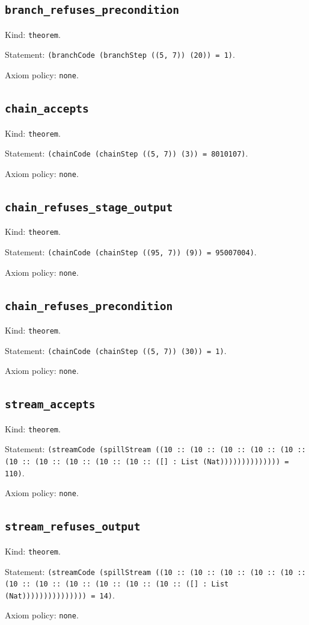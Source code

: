 \documentclass[11pt]{article}
\begin{document}
\subsection*{\texttt{branch\_refuses\_precondition}}
\noindent Kind: \texttt{theorem}.\par
\noindent Statement: \texttt{(branchCode (branchStep ((5, 7)) (20)) = 1)}.\par
\noindent Axiom policy: \texttt{none}.\par
\subsection*{\texttt{chain\_accepts}}
\noindent Kind: \texttt{theorem}.\par
\noindent Statement: \texttt{(chainCode (chainStep ((5, 7)) (3)) = 8010107)}.\par
\noindent Axiom policy: \texttt{none}.\par
\subsection*{\texttt{chain\_refuses\_stage\_output}}
\noindent Kind: \texttt{theorem}.\par
\noindent Statement: \texttt{(chainCode (chainStep ((95, 7)) (9)) = 95007004)}.\par
\noindent Axiom policy: \texttt{none}.\par
\subsection*{\texttt{chain\_refuses\_precondition}}
\noindent Kind: \texttt{theorem}.\par
\noindent Statement: \texttt{(chainCode (chainStep ((5, 7)) (30)) = 1)}.\par
\noindent Axiom policy: \texttt{none}.\par
\subsection*{\texttt{stream\_accepts}}
\noindent Kind: \texttt{theorem}.\par
\noindent Statement: \texttt{(streamCode (spillStream ((10 :: (10 :: (10 :: (10 :: (10 :: (10 :: (10 :: (10 :: (10 :: (10 :: ([] : List (Nat)))))))))))))) = 110)}.\par
\noindent Axiom policy: \texttt{none}.\par
\subsection*{\texttt{stream\_refuses\_output}}
\noindent Kind: \texttt{theorem}.\par
\noindent Statement: \texttt{(streamCode (spillStream ((10 :: (10 :: (10 :: (10 :: (10 :: (10 :: (10 :: (10 :: (10 :: (10 :: (10 :: ([] : List (Nat))))))))))))))) = 14)}.\par
\noindent Axiom policy: \texttt{none}.\par
\end{document}
